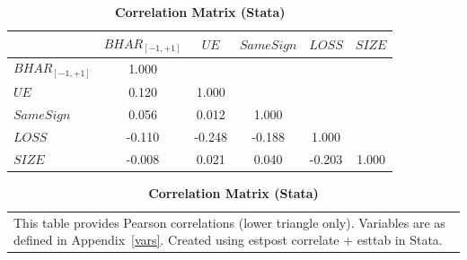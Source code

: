 \documentclass[english,12pt]{article}
\begin{document}
\begin{table}[htbp]\centering\footnotesize{
\renewcommand{\arraystretch}{1.5}
\caption{\textbf{Correlation Matrix (Stata)} \label{tab:corr-stata}}
\def\sym#1{\ifmmode^{#1}\else\(^{#1}\)\fi}

\begin{tabular}{l*{5}{c}}
\toprule
          & $BHAR_{[-1,+1]}$ & $UE$ & $SameSign$ & $LOSS$ & $SIZE$ \\
\midrule
$BHAR_{[-1,+1]}$ & 1.000 &       &       &       &       \\
$UE$            & 0.120 & 1.000 &       &       &       \\
$SameSign$       & 0.056 & 0.012 & 1.000 &       &       \\
$LOSS$           & -0.110 & -0.248 & -0.188 & 1.000 &       \\
$SIZE$       & -0.008 & 0.021 & 0.040 & -0.203 & 1.000 \\
\bottomrule
\end{tabular}

\vspace{-1.5\baselineskip}
\singlespace
\flushleft
\begin{tabular}{@{}p{\linewidth}@{}}
\footnotesize
This table provides Pearson correlations (lower triangle only). Variables are as defined in Appendix~\ref{vars}. Created using estpost correlate + esttab in Stata.
\end{tabular}
}
\end{table}


\clearpage\newpage

\end{document}
